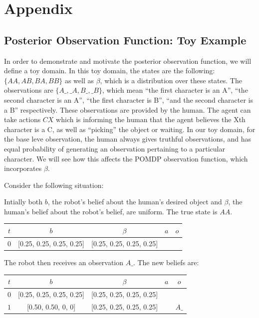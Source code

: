 \documentclass{article}
\begin{document}
\section{Appendix}

\subsection{Posterior Observation Function: Toy Example}
In order to demonstrate and motivate the posterior observation function, we will define a toy domain. In this toy domain, the states are the following: $\{AA, AB, BA, BB\}$ as well as $\beta$, which is a distribution over these states. The observations are $\{A\_, \_A, B\_, \_B\}$, which mean ``the first character is an A'', ``the second character is an A'', ``the first character is B'', ``and the second character is a B'' respectively. These observations are provided by the human. The agent can take actions $CX$ which is informing the human that the agent believes the Xth character is a C, as well as ``picking'' the object or waiting. In our toy domain, for the base leve observation, the human always gives truthful observations, and has equal probability of generating an observation pertaining to a particular character. We will see how this affects the POMDP observation function, which incorporates $\beta$. 

Consider the following situation: 

Intially both $b$, the robot's belief about the human's desired object and $\beta$, the human's belief about the robot's belief, are uniform. The true state is $AA$. 

\begin{center}
\begin{tabular}{|c| c| c| c | c|}
	\hline
	$t$ & $b$ & $\beta$ & $a$ & $o$ \\
	\hline
	$0$ & [0.25, 0.25, 0.25, 0.25] & [0.25, 0.25, 0.25, 0.25] & & \\
	\hline
\end{tabular}
\end{center}


The robot then receives an observation $A\_$. The new beliefs are: 

\begin{center}
\begin{tabular}{|c| c| c| c | c|}
	\hline
	$t$ & $b$ & $\beta$ & $a$ & $o$ \\
	\hline
	$0$ & [0.25, 0.25, 0.25, 0.25] & [0.25, 0.25, 0.25, 0.25] & & \\
	\hline
	$1$ & [0.50, 0.50, 0, 0] & [0.25, 0.25, 0.25, 0.25] & & $A\_$ \\
	\hline
\end{tabular}
\end{center}
\end{document}
